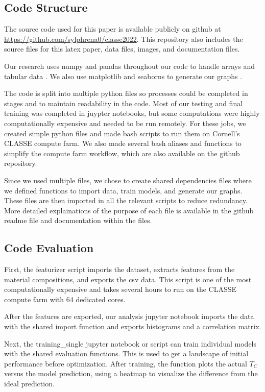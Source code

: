 \documentclass[twocolumn, nofootinbib, secnumarabic, amssymb, nobibnotes, aps, prd]{revtex4-2}
\begin{document}
\subsection{Code Structure} %
The source code used for this paper is available publicly on github at \url{https://github.com/sylphrena0/classe2022}. This repository also includes the source files for this latex paper, data files, images, and documentation files.

Our research uses numpy and pandas throughout our code to handle arrays and tabular data \cite{Harris2020array, Reback2020pandas}. We also use matplotlib and seaborns to generate our graphs \cite{Hunter2007, Waskom2021}.

The code is split into multiple python files so processes could be completed in stages and to maintain readability in the code. Most of our testing and final training was completed in juypter notebooks, but some computations were highly computationally expensive and needed to be run remotely. For these jobs, we created simple python files and made bash scripts to run them on Cornell's CLASSE compute farm. We also made several bash aliases and functions to simplify the compute farm workflow, which are also available on the github repository. 

Since we used multiple files, we chose to create shared dependencies files where we defined functions to import data, train models, and generate our graphs. These files are then imported in all the relevant scripts to reduce redundancy. More detailed explainations of the purpose of each file is available in the github readme file and documentation within the files.

\subsection{Code Evaluation}

First, the featurizer script imports the dataset, extracts features from the material compositions, and exports the csv data. This script is one of the most computationally expensive and takes several hours to run on the CLASSE compute farm with 64 dedicated cores.

After the features are exported, our analysis jupyter notebook imports the data with the shared import function and exports histograms and a correlation matrix. 

Next, the training\_single jupyter notebook or script can train individual models with the shared evaluation functions. This is used to get a landscape of initial performance before optimization. After training, the function plots the actual $T_C$ versus the model prediction, using a heatmap to visualize the difference from the ideal prediction.
\end{document}
